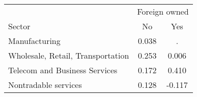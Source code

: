 \begin{tabular}{lcc}
\toprule
 & \multicolumn{2}{c}{Foreign owned} \\
\cmidrule(lr){2-3}
Sector & No & Yes \\
\midrule
Manufacturing & 0.038 & . \\
Wholesale, Retail, Transportation & 0.253 & 0.006 \\
Telecom and Business Services & 0.172 & 0.410 \\
Nontradable services & 0.128 & -0.117 \\
\bottomrule
\end{tabular}
